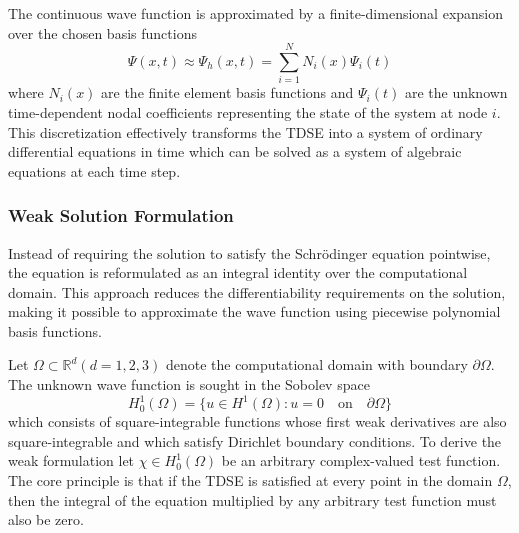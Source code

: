 \documentclass[11pt]{article}
\begin{document}
The continuous wave function is approximated by a finite-dimensional expansion over the chosen basis functions
\begin{equation}
	\Psi (x,t) \approx \Psi_h (x,t) = \sum_{i=1}^N N_i(x) \Psi_i (t)
\end{equation}
where $N_i(x)$ are the finite element basis functions and $\Psi_i (t)$ are the unknown time-dependent nodal coefficients representing the state of the system at node $i$. This discretization effectively transforms the TDSE into a system of ordinary differential equations in time which can be solved as a system of algebraic equations at each time step.

\subsubsection{Weak Solution Formulation}
Instead of requiring the solution to satisfy the Schrödinger equation pointwise, the equation is reformulated as an integral identity over the computational domain. This approach reduces the differentiability requirements on the solution, making it possible to approximate the wave function using piecewise polynomial basis functions.

Let $\Omega \subset \mathbb{R}^{d} (d=1,2,3)$ denote the computational domain with boundary $ \partial\Omega$. The unknown wave function is sought in the Sobolev space
\begin{equation}
	H_0^1 (\Omega) = \{ u \in H^1 (\Omega) : u = 0 \quad \text{on} \quad \partial \Omega \}
\end{equation}
which consists of square-integrable functions whose first weak derivatives are also square-integrable and which satisfy Dirichlet boundary conditions. To derive the weak formulation let $\chi \in H_0^1(\Omega)$ be an arbitrary complex-valued test function. The core principle is that if the TDSE is satisfied at every point in the domain $\Omega$, then the integral of the equation multiplied by any arbitrary test function must also be zero.
\end{document}
